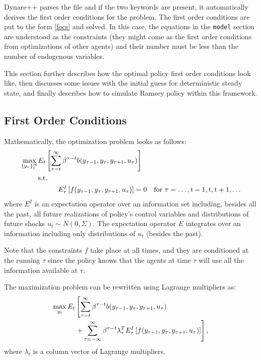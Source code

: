 \documentclass[10pt]{article}
\begin{document}
Dynare++ parses the file and if the two keywords are present, it
automatically derives the first order conditions for the problem. The
first order conditions are put to the form \eqref{focs} and solved. In
this case, the equations in the {\tt model} section are understood as
the constraints (they might come as the first order conditions from
optimizations of other agents) and their number must be less than the
number of endogenous variables.

This section further describes how the optimal policy first order
conditions look like, then discusses some issues with the initial
guess for deterministic steady state, and finally describes how to
simulate Ramsey policy within this framework.

\subsection{First Order Conditions}

Mathematically, the optimization problem looks as follows:
\begin{align}
\max_{\left\{y_\tau\right\}^\infty_t}&E_t
\left[\sum_{\tau=t}^\infty\beta^{\tau-t}b(y_{\tau-1},y_\tau,y_{\tau+1},u_\tau)\right]\notag\\
&\rm{s.t.}\label{planner_optim}\\
&\hskip1cm E^I_\tau\left[f(y_{\tau-1},y_\tau,y_{\tau+1},u_\tau)\right]=0\quad\rm{for\ }
\tau=\ldots,t-1,t,t+1,\ldots\notag
\end{align}
where $E^I$ is an expectation operator over an information set including,
besides all the past, all future realizations of policy's control
variables and distributions of future shocks $u_t\sim
N(0,\Sigma)$. The expectation operator $E$ integrates over an
information including only distributions of $u_t$ (besides the past).

Note that the constraints $f$ take place at all times, and they are
conditioned at the running $\tau$ since the policy knows that the
agents at time $\tau$ will use all the information available at
$\tau$.

The maximization problem can be rewritten using Lagrange multipliers as:
\begin{align}
\max_{y_t}E_t&\left[\sum_{\tau=t}^\infty\beta^{\tau-t}b(y_{\tau-1},y_\tau,y_{\tau+1},u_\tau)\right.\notag\\
&\left.+\sum_{\tau=-\infty}^{\infty}\beta^{\tau-t}\lambda^T_\tau E_\tau^I\left[f(y_{\tau-1},y_\tau,y_{\tau+1},u_\tau)\right]\right],
\label{planner_optim_l}
\end{align}
where $\lambda_t$ is a column vector of Lagrange multipliers.
\end{document}
